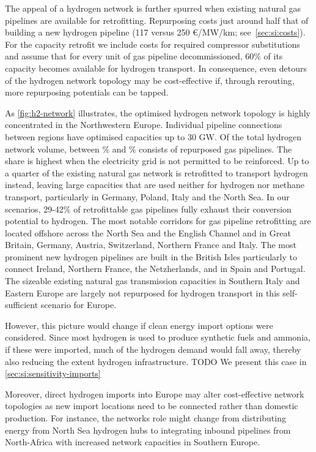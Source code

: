 The appeal of a hydrogen network is further spurred when existing natural gas
pipelines are available for retrofitting. Repurposing costs just around half
that of building a new hydrogen pipeline (117 versus 250 \euro/MW/km;
see~\cref{sec:si:costs}). For the capacity retrofit we include costs for
required compressor substitutions and assume that for every unit of gas pipeline
decommissioned, 60\% of its capacity becomes available for hydrogen transport.
In consequence, even detours of the hydrogen network topology may be
cost-effective if, through rerouting, more repurposing potentials can be tapped.

As \cref{fig:h2-network} illustrates, the optimised hydrogen network topology is
highly concentrated in the Northwestern Europe. Individual pipeline connections
between regions have optimised capacities up to 30 GW. Of the total hydrogen
network volume, between \minretroshare\% and \maxretroshare\% consists of
repurposed gas pipelines. The share is highest when the electricity grid is not
permitted to be reinforced. Up to a quarter of the existing natural gas network
is retrofitted to transport hydrogen instead, leaving large capacities that are
used neither for hydrogen nor methane transport, particularly in Germany,
Poland, Italy and the North Sea. In our scenarios, 29-42\% of retrofittable gas
pipelines fully exhaust their conversion potential to hydrogen. The most notable
corridors for gas pipeline retrofitting are located offshore across the North
Sea and the English Channel and in Great Britain, Germany, Austria, Switzerland,
Northern France and Italy. The most prominent new hydrogen pipelines are built
in the British Isles particularly to connect Ireland, Northern France, the
Netzherlands, and in Spain and Portugal. The sizeable existing natural gas
transmission capacities in Southern Italy and Eastern Europe are largely not
repurposed for hydrogen transport in this self-sufficient scenario for Europe.

However, this picture would change if clean energy import options were
considered. Since most hydrogen is used to produce synthetic fuels and ammonia,
if these were imported, much of the hydrogen demand would fall away, thereby
also reducing the extent hydrogen infrastructure.
TODO We present this case in \cref{sec:si:sensitivity-imports}

Moreover, direct hydrogen imports into Europe may alter cost-effective network
topologies as new import locations need to be connected rather than domestic
production. For instance, the networks role might change from distributing
energy from North Sea hydrogen hubs to integrating inbound pipelines from
North-Africa with increased network capacities in Southern Europe.

